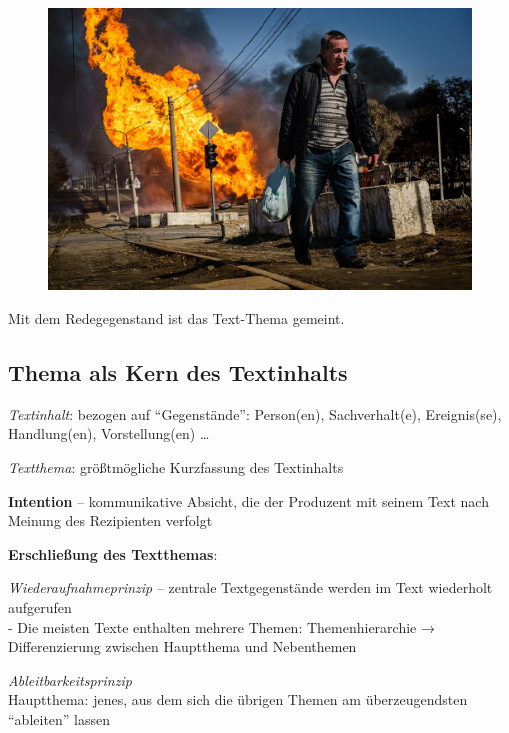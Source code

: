 \documentclass[
  letterpaper,
]{scrbook}
\begin{document}
\begin{figure}

{\centering 

\href{https://www.economist.com/interactive/europe/2022/08/24/six-months-of-war-in-ukraine}{\includegraphics[width=1\textwidth,height=\textheight]{./pictures/GettyImages-1239498621.jpg}}

}

\end{figure}

Mit dem Redegegenstand ist das Text-Thema gemeint.

\hypertarget{thema-als-kern-des-textinhalts}{%
\subsection{Thema als Kern des
Textinhalts}\label{thema-als-kern-des-textinhalts}}

\emph{Textinhalt}: bezogen auf ``Gegenstände'': Person(en),
Sachverhalt(e), Ereignis(se), Handlung(en), Vorstellung(en) \ldots{}

\emph{Textthema}: größtmögliche Kurzfassung des Textinhalts

\textbf{Intention} -- kommunikative Absicht, die der Produzent mit
seinem Text nach Meinung des Rezipienten verfolgt

\textbf{Erschließung des Textthemas}:

\emph{Wiederaufnahmeprinzip} -- zentrale Textgegenstände werden im Text
wiederholt aufgerufen\\
- Die meisten Texte enthalten mehrere Themen: Themenhierarchie →
Differenzierung zwischen Hauptthema und Nebenthemen

\emph{Ableitbarkeitsprinzip}\\
Hauptthema: jenes, aus dem sich die übrigen Themen am überzeugendsten
``ableiten'' lassen
\end{document}
